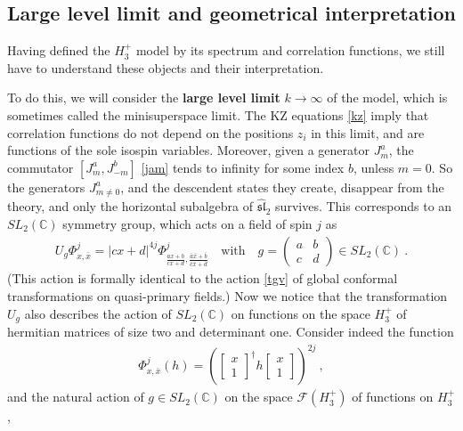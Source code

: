 \documentclass[12pt, a4paper, notitlepage, twoside]{report}
\numberwithin{equation}{section}
\theoremstyle{break}
\begin{document}
\subsection{Large level limit and geometrical interpretation}

Having defined the $H_3^+$ model by its spectrum and correlation functions, we still have to understand these objects and their interpretation.  

To do this, we will consider the \textbf{\boldmath large level limit} $k\to \infty$ of the model, which is sometimes called the minisuperspace limit. 
The KZ equations \eqref{kz} imply that correlation functions do not depend on the positions $z_i$ in this limit, and are functions of the sole isospin variables. 
Moreover, given a generator $J^a_m$, the commutator $[J^a_m,J^b_{-m}]$ \eqref{jam}  tends to infinity for some index $b$, unless $m=0$. 
So the generators $J^a_{m\neq 0}$, and the descendent states they create, disappear from the theory, and only the horizontal subalgebra of $\widehat{\mathfrak{sl}}_2$ survives.
This corresponds to an $SL_2({\mathbb{C}})$ symmetry group, which acts on a field of spin $j$ as 
\begin{align}
 U_g\Phi^j_{x,\bar{x}} = |cx+d|^{4j}\Phi^j_{\frac{ax+b}{cx+d},\frac{\bar{a}\bar{x}+\bar{b}}{\bar{c}\bar{x}+\bar{d}}} \quad \text{with} \quad g = \left(\begin{array}{cc} a & b \\ c & d \end{array}\right) \in SL_2({\mathbb{C}})\ .
\label{ugp}
\end{align}
(This action is formally identical to the action \eqref{tgv} of global conformal transformations on quasi-primary fields.)
Now we notice that the transformation $U_g$ also describes the action of $SL_2({\mathbb{C}})$ on functions on the space \textbf{\boldmath $H_3^+$} of hermitian matrices of size two and determinant one.
Consider indeed the function
\begin{align}
 \Phi^j_{x,\bar{x}}(h) = \left(\begin{bmatrix}
                                x \\ 1
                               \end{bmatrix}^\dagger 
h \begin{bmatrix}
   x \\ 1 
  \end{bmatrix}
 \right)^{2j}\ ,
\end{align}
and the natural action of $g\in SL_2({\mathbb{C}})$ on the space $\mathcal{F}(H_3^+)$ of functions on $H_3^+$,
\end{document}
